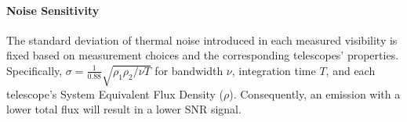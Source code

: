 %			
%			
%			


\paragraph{Noise Sensitivity} The standard deviation of thermal noise introduced in each measured visibility is fixed based on measurement choices and the corresponding telescopes' properties. Specifically, $\sigma = \frac{1}{0.88} \sqrt{ {\rho_1 \rho_2 }/{ \nu T } } $ for bandwidth $\nu$, integration time $T$, and each telescope's System Equivalent Flux Density ($\rho$).
Consequently, an emission with a lower total flux will result in a lower SNR signal.


